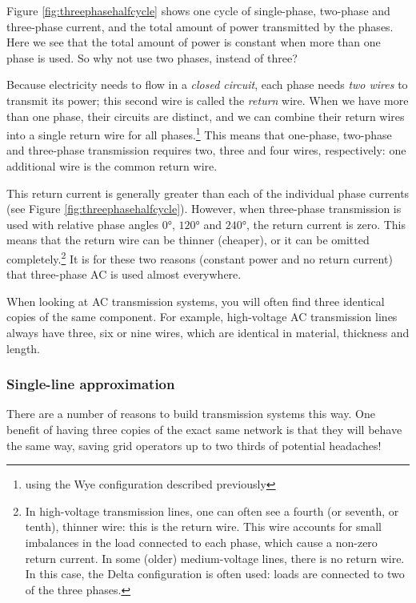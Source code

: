 \documentclass[main.tex]{subfiles}
\begin{document}
Figure \ref{fig:threephasehalfcycle} shows one cycle of single-phase, two-phase and three-phase current, and the total amount of power transmitted by the phases. Here we see that the total amount of power is constant when more than one phase is used. So why not use two phases, instead of three?

Because electricity needs to flow in a \emph{closed circuit}, each phase needs \emph{two wires} to transmit its power; this second wire is called the \emph{return} wire. When we have more than one phase, their circuits are distinct, and we can combine their return wires into a single return wire for all phases.\footnote{using the Wye configuration described previously} This means that one-phase, two-phase and three-phase transmission requires two, three and four wires, respectively: one additional wire is the common return wire.

This return current is generally greater than each of the individual phase currents (see Figure \ref{fig:threephasehalfcycle}). However, when three-phase transmission is used with relative phase angles $0\si{\degree}$, $120\si{\degree}$ and $240\si{\degree}$, the return current is zero. This means that the return wire can be thinner (\ie cheaper), or it can be omitted completely.\footnote{In high-voltage transmission lines, one can often see a fourth (or seventh, or tenth), thinner wire: this is the return wire. This wire accounts for small imbalances in the load connected to each phase, which cause a non-zero return current. In some (older) medium-voltage lines, there is no return wire. In this case, the Delta configuration is often used: loads are connected to two of the three phases.} It is for these two reasons (constant power and no return current) that three-phase AC is used almost everywhere. 

When looking at AC transmission systems, you will often find three identical copies of the same component. For example, high-voltage AC transmission lines always have three, six or nine wires, which are identical in material, thickness and length. 

\subsubsection{Single-line approximation}
There are a number of reasons to build transmission systems this way. One benefit of having three copies of the exact same network is that they will behave the same way, saving grid operators up to two thirds of potential headaches!
\end{document}
